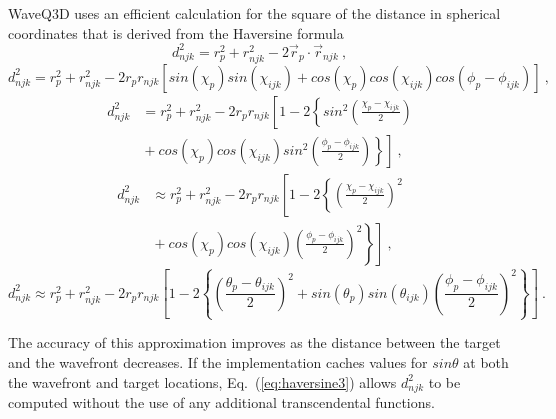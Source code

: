 \documentclass{ws-jca}
\begin{document}
WaveQ3D uses an efficient calculation for the square of the distance in spherical
coordinates that is derived from the Haversine formula\cite{Sinnott1984}
\begin{equation}
	d^2_{njk} = r^2_{p} + r^2_{njk} - 2 \vec{r}_{p} \cdot \vec{r}_{njk} \:,
	\label{eq:pythagoras1}
\end{equation}
\begin{equation}
	d^2_{njk} = r^2_{p} + r^2_{njk} - 2 r_{p} r_{njk}
	\left[ sin(\chi_{p}) sin(\chi_{ijk})
	+ cos(\chi_{p}) cos(\chi_{ijk}) cos(\phi_{p}-\phi_{ijk}) \right] \:,
	\label{eq:pythagoras2}
\end{equation}
\begin{align}
	d^2_{njk} &= r^2_{p} + r^2_{njk} - 2 r_{p} r_{njk}
	\left[ 1 - 2 \left\{ sin^2 \left( \frac{\chi_{p}-\chi_{ijk}}{2} \right) 
		\right.\right.\nonumber\\
	&\left.\left. {} + cos(\chi_{p}) cos(\chi_{ijk}) sin^2 
		\left( \frac{\phi_{p}-\phi_{ijk}}{2} \right) \right\} \right] \:,
\label{eq:haversine1}
\end{align}
\begin{align}
	d^2_{njk} &\approx r^2_{p} + r^2_{njk} - 2 r_{p} r_{njk}
	\left[ 1 - 2 \left\{ \left( \frac{\chi_{p}-\chi_{ijk}}{2} \right)^2 
		\right.\right.\nonumber\\
	&\left.\left. {} + cos(\chi_{p}) cos(\chi_{ijk}) 
		\left( \frac{\phi_{p}-\phi_{ijk}}{2} \right)^2 \right\} \right] \:,
	\label{eq:haversine2}
\end{align}
\begin{equation}
	d^2_{njk} \approx r^2_{p} + r^2_{njk} - 2 r_{p} r_{njk}
	\left[ 1 - 2 \left\{ \left( \frac{\theta_{p}-\theta_{ijk}}{2} \right)^2
		+ sin(\theta_{p}) sin(\theta_{ijk}) 
		\left( \frac{\phi_{p}-\phi_{ijk}}{2} \right)^2 \right\} \right] \:.
	\label{eq:haversine3}
\end{equation}

The accuracy of this approximation improves as the distance between the
target and the wavefront decreases. If the implementation caches values for
\(sin\theta\) at both the wavefront and target locations,
Eq.~(\ref{eq:haversine3}) allows \(d^2_{njk}\) to be computed without the
use of any additional transcendental functions.
\end{document}
